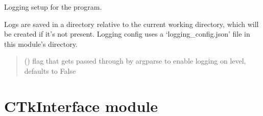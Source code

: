 \documentclass[letterpaper,10pt,english]{sphinxmanual}
\begin{document}

\begin{fulllineitems}
\label{\detokenize{main:main.setup_logging}}
\pysigstartsignatures
{}
\pysigstopsignatures
\sphinxAtStartPar
Logging setup for the program.

\sphinxAtStartPar
Logs are saved in a  directory relative to the current working directory,
which will be created if it’s not present.
Logging config uses a ‘logging\_config.json’ file in this module’s directory.
\begin{quote}\begin{description}
\sphinxAtStartPar
{} (\sphinxstyleliteralemphasis{\sphinxupquote{, }}) \textendash{} flag that gets passed through by argparse to enable logging on  level,    defaults to False

\end{description}\end{quote}

\end{fulllineitems}


\sphinxstepscope


\chapter{CTkInterface module}
\label{\detokenize{CTkInterface:module-src.CTkInterface}}\label{\detokenize{CTkInterface:ctkinterface-module}}\label{\detokenize{CTkInterface::doc}}
\end{document}
